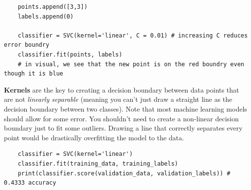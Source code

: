 \documentclass[11pt, a4paper]{article}
\begin{document}
\begin{spacing}{1.1}
\begin{lstlisting}
	points.append([3,3])
	labels.append(0)
	
	classifier = SVC(kernel='linear', C = 0.01) # increasing C reduces error boundry
	classifier.fit(points, labels)
	# in visual, we see that the new point is on the red boundry even though it is blue	\end{lstlisting} \newpage

	\noindent \textbf{Kernels} are the key to creating a decision boundary between data points that are not \textit{linearly separable} (meaning you can't just draw a straight line as the decision boundary between two classes). Note that most machine learning models should allow for some error. You shouldn’t need to create a non-linear decision boundary just to fit some outliers. Drawing a line that correctly separates every point would be drastically overfitting the model to the data.
	\begin{lstlisting}
	classifier = SVC(kernel='linear')
	classifier.fit(training_data, training_labels)
	print(classifier.score(validation_data, validation_labels)) # 0.4333 accuracy
	

\end{lstlisting}
\end{spacing}
\end{document}
